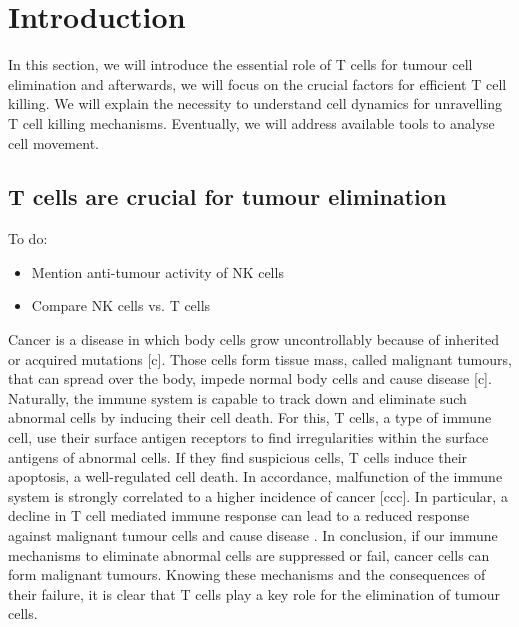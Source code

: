 \documentclass{report}
\begin{document}
\chapter{Introduction}


In this section, we will introduce the essential role of T cells for tumour cell elimination and afterwards, we will focus on the crucial factors for efficient T cell killing. We will explain the necessity to understand cell dynamics for unravelling T cell killing mechanisms. Eventually, we will address available tools to analyse cell movement.

\section{T cells are crucial for tumour elimination}

To do:
\begin{itemize}
	\item Mention anti-tumour activity of NK cells
	\item Compare NK cells vs. T cells
\end{itemize}

Cancer is a disease in which body cells grow uncontrollably because of inherited or acquired mutations [c]. Those cells form tissue mass, called malignant tumours, that can spread over the body, impede normal body cells and cause disease [c].
Naturally, the immune system is capable to track down and eliminate such abnormal cells by inducing their cell death. For this, T cells, a type of immune cell, use their surface antigen receptors to find irregularities within the surface antigens of abnormal cells. If they find suspicious cells, T cells induce their apoptosis, a well-regulated cell death.
In accordance, malfunction of the immune system is strongly correlated to a higher incidence of cancer [ccc]\citep{RN295}. In particular, a decline in T cell mediated immune response can lead to a reduced response against malignant tumour cells and cause disease \citep{RN295}.
In conclusion, if our immune mechanisms to eliminate abnormal cells are suppressed or fail, cancer cells can form malignant tumours. Knowing these mechanisms and the consequences of their failure, it is clear that T cells play a key role for the elimination of tumour cells.
\end{document}
